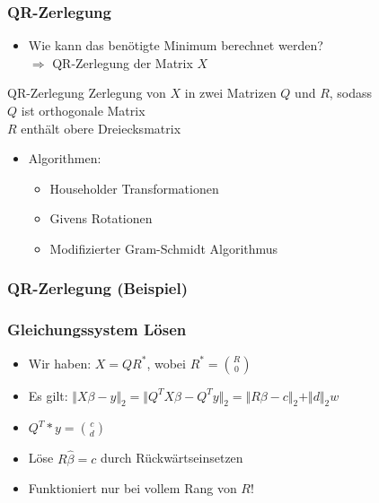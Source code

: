 \documentclass{beamer}
\begin{document}
\begin{frame}
  \frametitle{QR-Zerlegung}
  
  \begin{itemize}
  \item Wie kann das benötigte Minimum berechnet werden?\\
    $\Rightarrow$ QR-Zerlegung der Matrix $X$
  \end{itemize}

  \begin{block}{QR-Zerlegung}
    Zerlegung von $X$ in zwei Matrizen $Q$ und $R$, sodass \\
    \qquad $Q$ ist orthogonale Matrix \\
    \qquad $R$ enthält obere Dreiecksmatrix \\
  \end{block}

  \pause

  \begin{itemize}
  \item Algorithmen:
    \begin{itemize}
    \item Householder Transformationen 
    \item Givens Rotationen 
    \item Modifizierter Gram-Schmidt Algorithmus 
    \end{itemize}
  \end{itemize}

\end{frame}

\begin{frame}
  \frametitle{QR-Zerlegung (Beispiel)}
\end{frame}

\begin{frame}
  \frametitle{Gleichungssystem Lösen}
  
  \begin{itemize}
  \item Wir haben: $X = QR^*$, wobei $R^* = \binom{R}{0}$
  \item Es gilt: $\Vert X\beta - y \Vert_2 = \Vert Q^T X \beta - Q^T y \Vert_2 = \Vert R \beta - c \Vert_2 + \Vert d \Vert_2w$
  \item $Q^T * y = \binom{c}{d}$
  \item Löse $R \hat{\beta} = c$ durch Rückwärtseinsetzen
    
  \pause

  \item Funktioniert nur bei vollem Rang von $R$!
  \end{itemize}

\end{frame}
\end{document}
